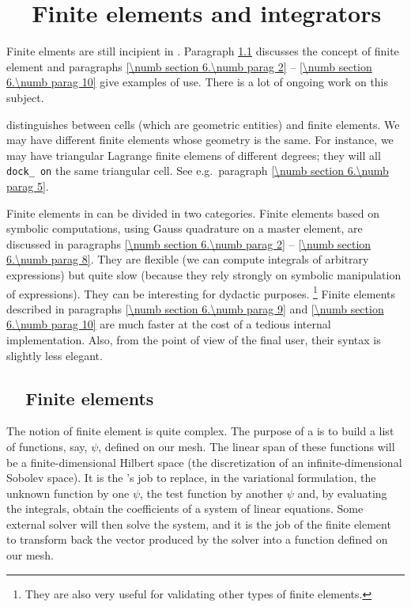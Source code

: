 
\chapter{~~Finite elements and integrators}\label{\numb section 6}


Finite elments are still incipient in \maniFEM.
Paragraph \ref{\numb section 6.\numb parag 1} discusses the concept of finite element
and paragraphs \ref{\numb section 6.\numb parag 2} -- \ref{\numb section 6.\numb parag 10}
give examples of use.
There is a lot of ongoing work on this subject.

{\ManiFEM} distinguishes between cells (which are geometric entities) and finite elements.
We may have different finite elements whose geometry is the same.
For instance, we may have triangular Lagrange finite elemens of different degrees;
they will all {\small\tt dock\_\,on} the same triangular cell.
See e.g.\ paragraph \ref{\numb section 6.\numb parag 5}.

Finite elements in {\maniFEM} can be divided in two categories.
Finite elements based on symbolic computations, using Gauss quadrature on a master element,
are discussed in
paragraphs \ref{\numb section 6.\numb parag 2} -- \ref{\numb section 6.\numb parag 8}.
They are flexible (we can compute integrals of arbitrary expressions) but quite slow
(because they rely strongly on symbolic manipulation of expressions).
They can be interesting for dydactic purposes.%
\footnote {{} They are also very useful for validating other types of finite elements.}
Finite elements described in paragraphs \ref{\numb section 6.\numb parag 9} and
\ref{\numb section 6.\numb parag 10} are much faster at the cost of a tedious internal
implementation.
Also, from the point of view of the final user, their syntax is slightly less elegant.


\section{~~Finite elements}\label{\numb section 6.\numb parag 1}

The notion of finite element is quite complex.
The purpose of a {\small\tt{}} is to build a list of functions, say, $ \psi $,
defined on our mesh.
The linear span of these functions will be a finite-dimensional Hilbert space
(the discretization of an infinite-dimensional Sobolev space).
It is the {\small\tt{}}'s job to replace, in the variational formulation,
the unknown function by one $ \psi $, the test function by another $ \psi $ and,
by evaluating the integrals, obtain the coefficients of a system of linear equations.
Some external solver will then solve the system, and it is the job of the finite element
to transform back the vector produced by the solver into a function defined on our mesh.

